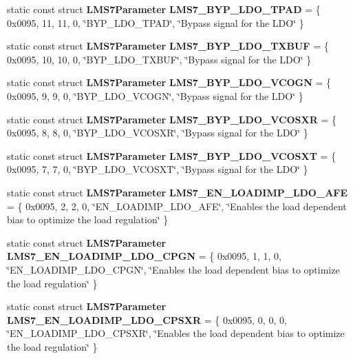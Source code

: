 \begin{DoxyCompactItemize}
\item 
static const struct {\bf L\+M\+S7\+Parameter} {\bf L\+M\+S7\+\_\+\+B\+Y\+P\+\_\+\+L\+D\+O\+\_\+\+T\+P\+AD} = \{ 0x0095, 11, 11, 0, \char`\"{}\+B\+Y\+P\+\_\+\+L\+D\+O\+\_\+\+T\+P\+A\+D\char`\"{}, \char`\"{}\+Bypass signal for the L\+D\+O\char`\"{} \}
\item 
static const struct {\bf L\+M\+S7\+Parameter} {\bf L\+M\+S7\+\_\+\+B\+Y\+P\+\_\+\+L\+D\+O\+\_\+\+T\+X\+B\+UF} = \{ 0x0095, 10, 10, 0, \char`\"{}\+B\+Y\+P\+\_\+\+L\+D\+O\+\_\+\+T\+X\+B\+U\+F\char`\"{}, \char`\"{}\+Bypass signal for the L\+D\+O\char`\"{} \}
\item 
static const struct {\bf L\+M\+S7\+Parameter} {\bf L\+M\+S7\+\_\+\+B\+Y\+P\+\_\+\+L\+D\+O\+\_\+\+V\+C\+O\+GN} = \{ 0x0095, 9, 9, 0, \char`\"{}\+B\+Y\+P\+\_\+\+L\+D\+O\+\_\+\+V\+C\+O\+G\+N\char`\"{}, \char`\"{}\+Bypass signal for the L\+D\+O\char`\"{} \}
\item 
static const struct {\bf L\+M\+S7\+Parameter} {\bf L\+M\+S7\+\_\+\+B\+Y\+P\+\_\+\+L\+D\+O\+\_\+\+V\+C\+O\+S\+XR} = \{ 0x0095, 8, 8, 0, \char`\"{}\+B\+Y\+P\+\_\+\+L\+D\+O\+\_\+\+V\+C\+O\+S\+X\+R\char`\"{}, \char`\"{}\+Bypass signal for the L\+D\+O\char`\"{} \}
\item 
static const struct {\bf L\+M\+S7\+Parameter} {\bf L\+M\+S7\+\_\+\+B\+Y\+P\+\_\+\+L\+D\+O\+\_\+\+V\+C\+O\+S\+XT} = \{ 0x0095, 7, 7, 0, \char`\"{}\+B\+Y\+P\+\_\+\+L\+D\+O\+\_\+\+V\+C\+O\+S\+X\+T\char`\"{}, \char`\"{}\+Bypass signal for the L\+D\+O\char`\"{} \}
\item 
static const struct {\bf L\+M\+S7\+Parameter} {\bf L\+M\+S7\+\_\+\+E\+N\+\_\+\+L\+O\+A\+D\+I\+M\+P\+\_\+\+L\+D\+O\+\_\+\+A\+FE} = \{ 0x0095, 2, 2, 0, \char`\"{}\+E\+N\+\_\+\+L\+O\+A\+D\+I\+M\+P\+\_\+\+L\+D\+O\+\_\+\+A\+F\+E\char`\"{}, \char`\"{}\+Enables the load dependent bias to optimize the load regulation\char`\"{} \}
\item 
static const struct {\bf L\+M\+S7\+Parameter} {\bf L\+M\+S7\+\_\+\+E\+N\+\_\+\+L\+O\+A\+D\+I\+M\+P\+\_\+\+L\+D\+O\+\_\+\+C\+P\+GN} = \{ 0x0095, 1, 1, 0, \char`\"{}\+E\+N\+\_\+\+L\+O\+A\+D\+I\+M\+P\+\_\+\+L\+D\+O\+\_\+\+C\+P\+G\+N\char`\"{}, \char`\"{}\+Enables the load dependent bias to optimize the load regulation\char`\"{} \}
\item 
static const struct {\bf L\+M\+S7\+Parameter} {\bf L\+M\+S7\+\_\+\+E\+N\+\_\+\+L\+O\+A\+D\+I\+M\+P\+\_\+\+L\+D\+O\+\_\+\+C\+P\+S\+XR} = \{ 0x0095, 0, 0, 0, \char`\"{}\+E\+N\+\_\+\+L\+O\+A\+D\+I\+M\+P\+\_\+\+L\+D\+O\+\_\+\+C\+P\+S\+X\+R\char`\"{}, \char`\"{}\+Enables the load dependent bias to optimize the load regulation\char`\"{} \}

\end{DoxyCompactItemize}
